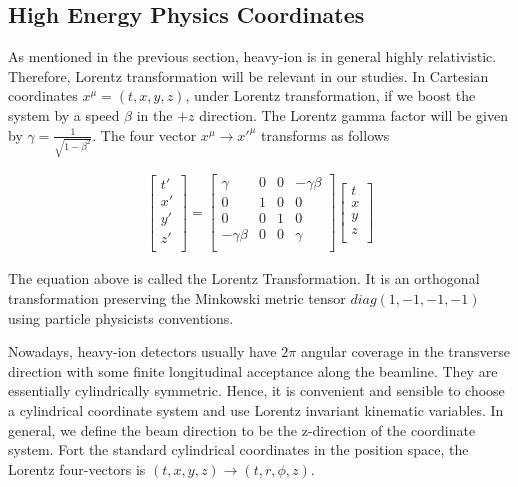\subsection{High Energy Physics Coordinates}

As mentioned in the previous section, heavy-ion is in general highly relativistic. Therefore, Lorentz transformation will be relevant in our studies. In Cartesian coordinates $x^\mu = (t,x,y,z)$, under Lorentz transformation, if we boost the system by a speed $\beta$ in the $+z$ direction. The Lorentz gamma factor will be given by $\gamma = \frac{1}{\sqrt{1 - \beta^2}}$. The four vector $x^\mu \rightarrow x'^\mu$ transforms as follows

\begin{align}
   \begin{bmatrix} 
           t' \\
           x' \\
           y' \\
           z' \\
         \end{bmatrix} =
             \begin{bmatrix} 
             \gamma  & 0  & 0 & - \gamma \beta \\ 
            0 & 1 & 0 & 0 \\ 
             0 & 0 & 1 & 0 \\
             - \gamma  \beta & 0 & 0 &  \gamma \\
	\end{bmatrix} 
	  \begin{bmatrix} 
           t \\
           x \\
           y \\
           z \\
	\end{bmatrix}
\end{align}

The equation above is called the Lorentz Transformation. It is an orthogonal transformation preserving the Minkowski metric tensor $diag(1,-1,-1,-1)$ using particle physicists conventions.


Nowadays, heavy-ion detectors usually have $2\pi$ angular coverage in the transverse direction with some finite longitudinal acceptance along the beamline. They are essentially cylindrically symmetric. Hence, it is convenient and sensible to choose a cylindrical coordinate system and use Lorentz invariant kinematic variables. In general, we define the beam direction to be the z-direction of the coordinate system. Fort the standard cylindrical coordinates in the position space, the Lorentz four-vectors is $(t,x,y,z) \rightarrow (t, r, \phi, z)$. 



